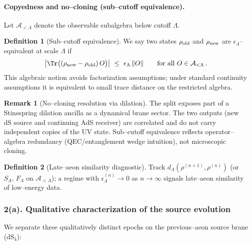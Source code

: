 \documentclass[10pt]{article}
\theoremstyle{definition}
\newtheorem{definition}{Definition}[section]
\newtheorem{remark}{Remark}[section]
\theoremstyle{plain}
\begin{document}
\paragraph{Copyedness and no--cloning (sub--cutoff equivalence).}\label{par:uom-main-144}
Let $\mathcal A_{<\Lambda}$ denote the observable subalgebra below cutoff $\Lambda$.
\begin{definition}[Sub--cutoff equivalence]
\label{def:uom-main-002}
We say two states $\rho_{\rm old}$ and $\rho_{\rm new}$ are $\epsilon_\Lambda$--equivalent at scale $\Lambda$ if
\[
\big|\Tr\big((\rho_{\rm new}-\rho_{\rm old})\,O\big)\big|\ \le\ \epsilon_\Lambda\,\|O\|\qquad
\text{for all }O\in\mathcal A_{<\Lambda}\,.
\]
This algebraic notion avoids factorization assumptions; under standard continuity assumptions it is
equivalent to small trace distance on the restricted algebra.
\end{definition}
\begin{remark}[No--cloning resolution via dilation]
\label{rem:uom-main-007}
The split exposes part of a Stinespring dilation ancilla as a dynamical brane sector. The two outputs
(new dS source and continuing AdS receiver) are correlated and do not carry independent copies of the UV state.
Sub--cutoff equivalence reflects operator--algebra redundancy (QEC/entanglement wedge intuition), not
microscopic cloning.
\end{remark}
\begin{definition}[Late--aeon similarity diagnostic]
\label{def:uom-main-003}
Track $d_\Lambda(\rho^{(n+1)},\rho^{(n)})$ (or $S_\Lambda$, $F_\Lambda$ on $\mathcal A_{<\Lambda}$); a regime
with $\epsilon_\Lambda^{(n)}\to 0$ as $n\to\infty$ signals late--aeon similarity of low--energy data.
\end{definition}



\subsubsection*{2(a). Qualitative characterization of the source evolution}
\label{subsubsec:source-phases}
We separate three qualitatively distinct epochs on the previous–aeon source brane (dS$_4$):
\end{document}
